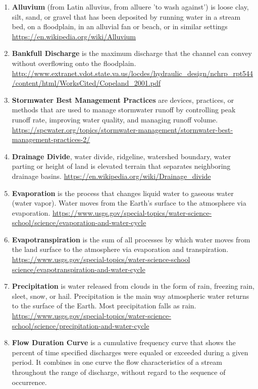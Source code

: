 \documentclass[12pt]{article}
\begin{document}
\begin{enumerate}
 \begin{enumerate}
 \item \textbf{Alluvium} (from Latin alluvius, from alluere 'to wash against') is loose clay, silt, sand, or gravel that has been deposited by running water in a stream bed, on a floodplain, in an alluvial fan or beach, or in similar settings 
 \url{https://en.wikipedia.org/wiki/Alluvium}
 \item \textbf{Bankfull Discharge} is the maximum discharge that the channel can convey without overflowing onto the floodplain. 
 \url{http://www.extranet.vdot.state.va.us/locdes/hydraulic_design/nchrp_rpt544/content/html/WorksCited/Copeland_2001.pdf}
 \item \textbf{Stormwater Best Management Practices} are devices, practices, or methods that are used to manage stormwater runoff by controlling peak runoff rate, improving water quality, and managing runoff volume. 
 \url{https://spcwater.org/topics/stormwater-management/stormwater-best-management-practices-2/}
 \item \textbf{Drainage Divide}, water divide, ridgeline, watershed boundary, water parting or height of land is elevated terrain that separates neighboring drainage basins. 
 \url{https://en.wikipedia.org/wiki/Drainage_divide}
 \item \textbf{Evaporation} is the process that changes liquid water to gaseous water (water vapor). Water moves from the Earth’s surface to the atmosphere via evaporation. 
 \url{https://www.usgs.gov/special-topics/water-science-school/science/evaporation-and-water-cycle} 
 \item \textbf{Evapotranspiration} is the sum of all processes by which water moves from the land surface to the atmosphere via evaporation and transpiration. 
 \url{https://www.usgs.gov/special-topics/water-science-school
 science/evapotranspiration-and-water-cycle} 
 \item \textbf{Precipitation} is water released from clouds in the form of rain, freezing rain, sleet, snow, or hail. Precipitation is the main way atmospheric water returns to the surface of the Earth. Most precipitation falls as rain. 
 \url{https://www.usgs.gov/special-topics/water-science-school/science/precipitation-and-water-cycle} 
 \item \textbf{Flow Duration Curve} is a cumulative frequency curve that shows the percent of time specified discharges were equaled or exceeded during a given period. It combines in one curve the flow characteristics of a stream throughout the range of discharge, without regard to the sequence of occurrence. 

\end{enumerate}
\end{enumerate}
\end{document}
